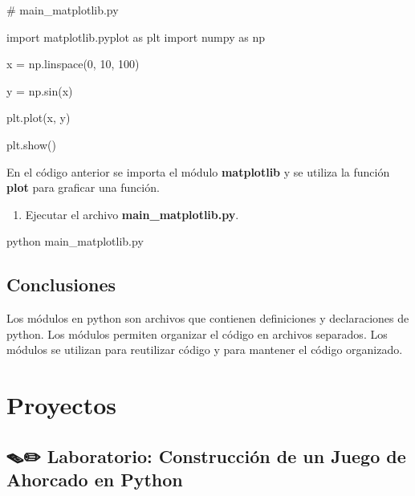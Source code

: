 \documentclass[
  a4paper,
  DIV=11,
  numbers=noendperiod,
  onepage,
  openany]{scrreprt}
\newenvironment{Shaded}{\begin{snugshade}}{\end{snugshade}}
\newcommand{\CommentTok}[1]{\textcolor[rgb]{0.37,0.37,0.37}{#1}}
\newcommand{\DecValTok}[1]{\textcolor[rgb]{0.68,0.00,0.00}{#1}}
\newcommand{\ExtensionTok}[1]{\textcolor[rgb]{0.00,0.23,0.31}{#1}}
\newcommand{\ImportTok}[1]{\textcolor[rgb]{0.00,0.46,0.62}{#1}}
\newcommand{\NormalTok}[1]{\textcolor[rgb]{0.00,0.23,0.31}{#1}}
\newcommand{\OperatorTok}[1]{\textcolor[rgb]{0.37,0.37,0.37}{#1}}
\providecommand{\tightlist}{%
  \setlength{\itemsep}{0pt}\setlength{\parskip}{0pt}}\usepackage{longtable,booktabs,array}
\begin{document}
\begin{Shaded}
\begin{Highlighting}[]
\CommentTok{\# main\_matplotlib.py}

\ImportTok{import}\NormalTok{ matplotlib.pyplot }\ImportTok{as}\NormalTok{ plt}
\ImportTok{import}\NormalTok{ numpy }\ImportTok{as}\NormalTok{ np}

\NormalTok{x }\OperatorTok{=}\NormalTok{ np.linspace(}\DecValTok{0}\NormalTok{, }\DecValTok{10}\NormalTok{, }\DecValTok{100}\NormalTok{)}

\NormalTok{y }\OperatorTok{=}\NormalTok{ np.sin(x)}

\NormalTok{plt.plot(x, y)}

\NormalTok{plt.show()}
\end{Highlighting}
\end{Shaded}

En el código anterior se importa el módulo \textbf{matplotlib} y se
utiliza la función \textbf{plot} para graficar una función.

\begin{enumerate}
\def\labelenumi{\arabic{enumi}.}
\setcounter{enumi}{9}
\tightlist
\item
  Ejecutar el archivo \textbf{main\_matplotlib.py}.
\end{enumerate}

\begin{Shaded}
\begin{Highlighting}[]
\ExtensionTok{python}\NormalTok{ main\_matplotlib.py}
\end{Highlighting}
\end{Shaded}

\chapter{Conclusiones}\label{conclusiones-5}

Los módulos en python son archivos que contienen definiciones y
declaraciones de python. Los módulos permiten organizar el código en
archivos separados. Los módulos se utilizan para reutilizar código y
para mantener el código organizado.

\part{Proyectos}

\chapter{🪤✏️ Laboratorio: Construcción de un Juego de Ahorcado en
Python}\label{laboratorio-construcciuxf3n-de-un-juego-de-ahorcado-en-python}
\end{document}
